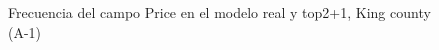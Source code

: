 \begin{figure}[H]
    \centering
    
    \caption{Frecuencia del campo Price en el modelo real y top2+1, King county (A-1)}
    \label{frecuency-top2+1-price}
\end{figure}